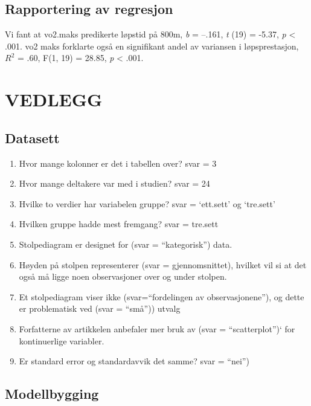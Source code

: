 \documentclass[
]{book}
\providecommand{\tightlist}{%
  \setlength{\itemsep}{0pt}\setlength{\parskip}{0pt}}
\begin{document}
\hypertarget{rapportering-av-regresjon}{%
\section{Rapportering av regresjon}\label{rapportering-av-regresjon}}

Vi fant at vo2.maks predikerte løpstid på 800m, \emph{b} = --.161, \emph{t} (19) = -5.37, \emph{p} \textless{} .001. vo2 maks forklarte også en signifikant andel av variansen i løpsprestasjon, \(R^2\) = .60, F(1, 19) = 28.85, \emph{p} \textless{} .001.

\hypertarget{vedlegg}{%
\chapter{VEDLEGG}\label{vedlegg}}

\hypertarget{datasett-3}{%
\section{Datasett}\label{datasett-3}}

\begin{enumerate}
\def\labelenumi{\alph{enumi}.}
\tightlist
\item
  Hvor mange kolonner er det i tabellen over? svar = 3
\item
  Hvor mange deltakere var med i studien? svar = 24
\item
  Hvilke to verdier har variabelen gruppe? svar = `ett.sett' og `tre.sett'
\item
  Hvilken gruppe hadde mest fremgang? svar = tre.sett
\item
  Stolpediagram er designet for (svar = ``kategorisk'') data.
\item
  Høyden på stolpen representerer (svar = gjennomsnittet), hvilket vil si at det også må ligge noen observasjoner over og under stolpen.
\item
  Et stolpediagram viser ikke (svar=``fordelingen av observasjonene''), og dette er problematisk ved (svar = ``små'')) utvalg
\item
  Forfatterne av artikkelen anbefaler mer bruk av (svar = ``scatterplot'')` for kontinuerlige variabler.
\item
  Er standard error og standardavvik det samme? svar = ``nei'')
\end{enumerate}

\hypertarget{modellbygging}{%
\section{Modellbygging}\label{modellbygging}}
\end{document}
